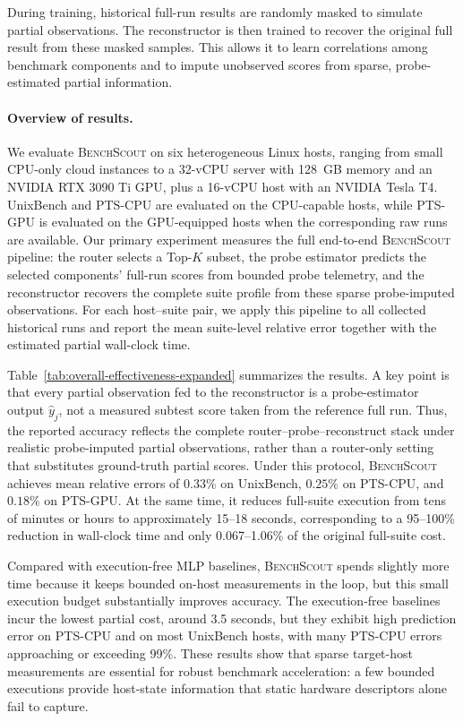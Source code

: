\documentclass[sigplan,10pt, anonymous]{acmart}
\newcommand{\ptscpu}{PTS-CPU}
\newcommand{\ptsgpu}{PTS-GPU}
\begin{document}
During training, historical full-run results are randomly masked to simulate partial observations. The reconstructor is then trained to recover the original full result from these masked samples. This allows it to learn correlations among benchmark components and to impute unobserved scores from sparse, probe-estimated partial information.



\paragraph{Overview of results.}
We evaluate \textsc{BenchScout} on six heterogeneous Linux hosts, ranging from small CPU-only cloud instances to a 32-vCPU server with 128~GB memory and an NVIDIA RTX 3090 Ti GPU, plus a 16-vCPU host with an NVIDIA Tesla T4.
UnixBench and \ptscpu{} are evaluated on the CPU-capable hosts, while \ptsgpu{} is evaluated on the GPU-equipped hosts when the corresponding raw runs are available.
Our primary experiment measures the full end-to-end \textsc{BenchScout} pipeline: the router selects a Top-$K$ subset, the probe estimator predicts the selected components' full-run scores from bounded probe telemetry, and the reconstructor recovers the complete suite profile from these sparse probe-imputed observations.
For each host--suite pair, we apply this pipeline to all collected historical runs and report the mean suite-level relative error together with the estimated partial wall-clock time.

Table~\ref{tab:overall-effectiveness-expanded} summarizes the results.
A key point is that every partial observation fed to the reconstructor is a probe-estimator output $\hat{y}_j$, not a measured subtest score taken from the reference full run.
Thus, the reported accuracy reflects the complete router--probe--reconstruct stack under realistic probe-imputed partial observations, rather than a router-only setting that substitutes ground-truth partial scores.
Under this protocol, \textsc{BenchScout} achieves mean relative errors of $0.33\%$ on UnixBench, $0.25\%$ on \ptscpu{}, and $0.18\%$ on \ptsgpu{}.
At the same time, it reduces full-suite execution from tens of minutes or hours to approximately 15--18 seconds, corresponding to a 95--100\% reduction in wall-clock time and only 0.067--1.06\% of the original full-suite cost.

Compared with execution-free MLP baselines, \textsc{BenchScout} spends slightly more time because it keeps bounded on-host measurements in the loop, but this small execution budget substantially improves accuracy.
The execution-free baselines incur the lowest partial cost, around 3.5 seconds, but they exhibit high prediction error on \ptscpu{} and on most UnixBench hosts, with many \ptscpu{} errors approaching or exceeding 99\%.
These results show that sparse target-host measurements are essential for robust benchmark acceleration: a few bounded executions provide host-state information that static hardware descriptors alone fail to capture.
\end{document}
